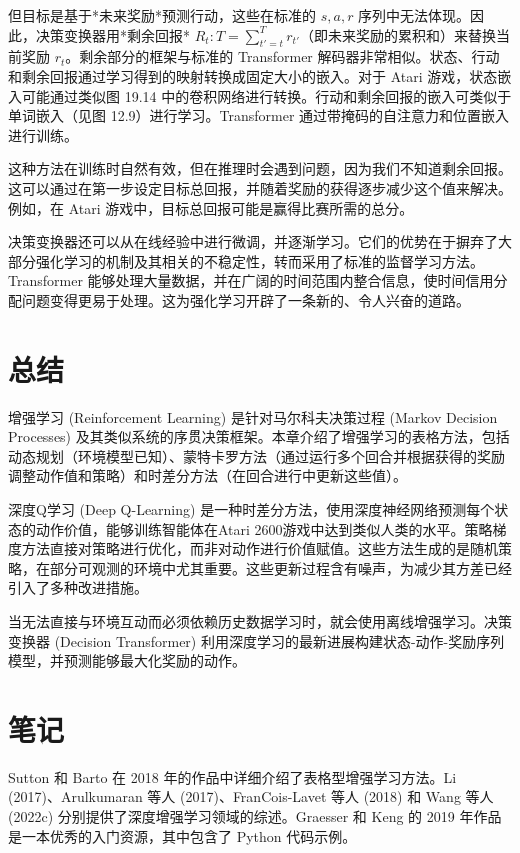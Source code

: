 但目标是基于*未来奖励*预测行动，这些在标准的 \(s, a, r\) 序列中无法体现。因此，决策变换器用*剩余回报* \(R_t:T = \sum_{t'=t}^T r_{t'}\)（即未来奖励的累积和）来替换当前奖励 \(r_t\)。剩余部分的框架与标准的 Transformer 解码器非常相似。状态、行动和剩余回报通过学习得到的映射转换成固定大小的嵌入。对于 Atari 游戏，状态嵌入可能通过类似图 19.14 中的卷积网络进行转换。行动和剩余回报的嵌入可类似于单词嵌入（见图 12.9）进行学习。Transformer 通过带掩码的自注意力和位置嵌入进行训练。

这种方法在训练时自然有效，但在推理时会遇到问题，因为我们不知道剩余回报。这可以通过在第一步设定目标总回报，并随着奖励的获得逐步减少这个值来解决。例如，在 Atari 游戏中，目标总回报可能是赢得比赛所需的总分。

决策变换器还可以从在线经验中进行微调，并逐渐学习。它们的优势在于摒弃了大部分强化学习的机制及其相关的不稳定性，转而采用了标准的监督学习方法。Transformer 能够处理大量数据，并在广阔的时间范围内整合信息，使时间信用分配问题变得更易于处理。这为强化学习开辟了一条新的、令人兴奋的道路。

\section{总结}
增强学习 (Reinforcement Learning) 是针对马尔科夫决策过程 (Markov Decision Processes) 及其类似系统的序贯决策框架。本章介绍了增强学习的表格方法，包括动态规划（环境模型已知）、蒙特卡罗方法（通过运行多个回合并根据获得的奖励调整动作值和策略）和时差分方法（在回合进行中更新这些值）。

深度Q学习 (Deep Q-Learning) 是一种时差分方法，使用深度神经网络预测每个状态的动作价值，能够训练智能体在Atari 2600游戏中达到类似人类的水平。策略梯度方法直接对策略进行优化，而非对动作进行价值赋值。这些方法生成的是随机策略，在部分可观测的环境中尤其重要。这些更新过程含有噪声，为减少其方差已经引入了多种改进措施。

当无法直接与环境互动而必须依赖历史数据学习时，就会使用离线增强学习。决策变换器 (Decision Transformer) 利用深度学习的最新进展构建状态-动作-奖励序列模型，并预测能够最大化奖励的动作。


\section{笔记}
Sutton 和 Barto 在 2018 年的作品中详细介绍了表格型增强学习方法。Li (2017)、Arulkumaran 等人 (2017)、FranCois-Lavet 等人 (2018) 和 Wang 等人 (2022c) 分别提供了深度增强学习领域的综述。Graesser 和 Keng 的 2019 年作品是一本优秀的入门资源，其中包含了 Python 代码示例。

